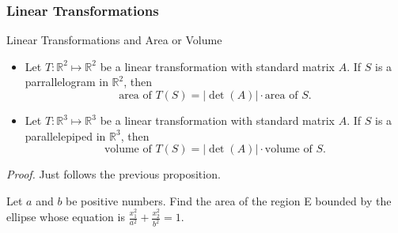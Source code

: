 \documentclass[10pt, a4paper]{article}
\newcommand{\R}{\mathbb{R}}
\begin{document}
\subsubsection*{Linear Transformations}
\begin{proposition}Linear Transformations and Area or Volume\\
    \begin{itemize}
        \item Let $T:\R^2\mapsto\R^2$ be a linear transformation with standard matrix $A$. If $S$ is a parrallelogram in $\R^2$, then $$
        {\text{area of } T(S)} = |\det(A)|\cdot {\text{area of } S}.
        $$
        \item Let $T:\R^3\mapsto\R^3$ be a linear transformation with standard matrix $A$. If $S$ is a parallelepiped in $\R^3$, then $$
        {\text{volume of } T(S)} = |\det(A)|\cdot {\text{volume of } S}.
        $$
    \end{itemize}
\end{proposition}
\indent\textit{Proof.} Just follows the previous proposition.
\begin{example}
    Let $a$ and $b$ be positive numbers. Find the area of the region E bounded by the ellipse whose equation is $\frac{x_1^2}{a^2} + \frac{x_2^2}{b^2} = 1$.\\
\end{example}
\end{document}

